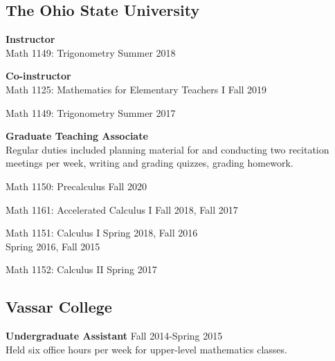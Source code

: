 \documentclass[10pt,letterpaper]{article}
\renewenvironment{itemize}{
  \begin{list}{}{
    \setlength{\leftmargin}{1.5em}
    \setlength{\itemsep}{0.25em}
    \setlength{\parskip}{0pt}
    \setlength{\parsep}{0.25em}
  }
}{
  \end{list}
}
\begin{document}
\subsection*{The Ohio State University}
\begin{itemize}
\item {\bf {\fontsize{11}{11}\selectfont Instructor}}\\
{Math 1149: Trigonometry} \hfill Summer 2018




\item {\bf {\fontsize{11}{11}\selectfont Co-instructor}}\\
{Math 1125: Mathematics for Elementary Teachers I} \hfill Fall 2019



Math 1149: Trigonometry \hfill Summer 2017\\




\item {\bf {\fontsize{11}{11}\selectfont Graduate Teaching Associate}} \\
  {Regular duties included planning material for and conducting two recitation meetings per week, writing and grading quizzes, grading homework.}
  
  \begin{itemize}
  \item Math 1150: Precalculus
    \hfill Fall 2020
  
  \item Math 1161: Accelerated Calculus I 
  \hfill Fall 2018, Fall 2017
  
  \item Math 1151: Calculus I
  \hfill Spring 2018, Fall 2016 \\
  \vphantom{M}\hfill Spring 2016, Fall 2015
  
  \item Math 1152: Calculus II
  \hfill Spring 2017

  \end{itemize}

\subsection*{Vassar College}
\begin{itemize}
\item {\bf Undergraduate Assistant} \hfill Fall 2014-Spring 2015 \\
  {Held six office hours per week for upper-level mathematics classes.}
\end{itemize}

\end{itemize}
\end{document}
